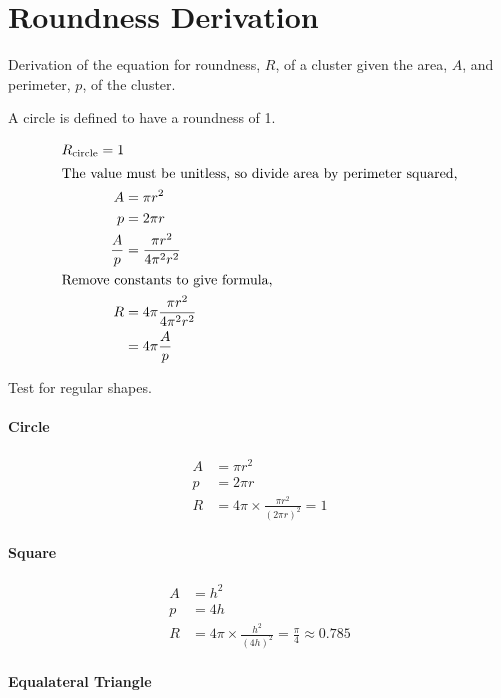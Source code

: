 
\section{Roundness Derivation}
\label{app:roundness_derivation}

Derivation of the equation for roundness, $R$, of a cluster given the area,
$A$, and perimeter, $p$, of the cluster.

A circle is defined to have a roundness of 1.

\begin{align}
	R_\textrm{circle} = 1 \\
\intertext{The value must be unitless, so divide area by perimeter squared,}
	A &= \pi r^2 \\
	p &= 2\pi r \\
	\frac{A}{p} &= \frac{\pi r^2}{4\pi^2 r^2} \\
\intertext{Remove constants to give formula,}
	R &= 4\pi\frac{\pi r^2}{4\pi^2 r^2} \\
		&= 4\pi \frac{A}{p}
\end{align}

Test for regular shapes.

\paragraph{Circle}
\label{par:circle}

\begin{align}
	A &= \pi r^2 \\
	p &= 2\pi r \\
	R &= 4\pi \times \frac{\pi r^2}{(2\pi r)^2} = 1
\end{align}

\paragraph{Square}
\label{par:square}

\begin{align}
	A &= h^2 \\
	p &= 4h \\
	R &= 4\pi \times \frac{h^2}{(4h)^2} = \frac{\pi}{4} \approx 0.785
\end{align}

\paragraph{Equalateral Triangle}
\label{par:equalateral_triangle}


